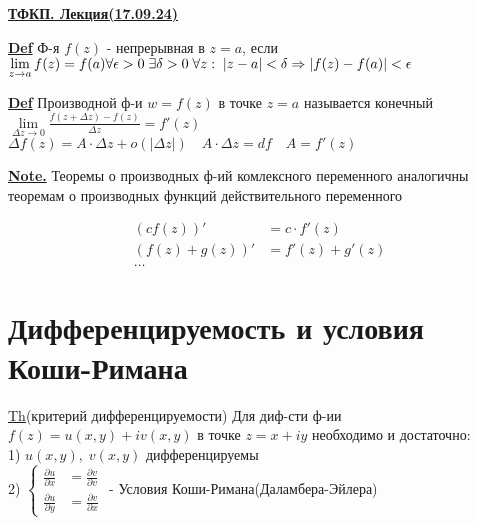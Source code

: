 \documentclass[12pt]{article}
\begin{document}
\begin{center}
    \textbf{\underline{ТФКП. Лекция(17.09.24)}} \\
\end{center}

\textbf{\underline{Def}} Ф-я $ f(z) $ - непрерывная в $z = a$, если 
$ \lim\limits_{z\to a} f(z) = f(a) \\
    \forall \epsilon > 0 \; \exists \delta > 0 \; \forall z: \; |z-a|<\delta 
    \Rightarrow |f(z) - f(a)| < \epsilon 
$

\textbf{\underline{Def}} Производной ф-и $w = f(z) $ в точке $z=a$ называется конечный
$ \lim\limits_{\Delta z \to 0}  \frac{f(z+\Delta z) - f(z)}{\Delta z} = f'(z) $ \\
$ \Delta f(z) = A \cdot \Delta z + o(|\Delta z|) \quad A\cdot \Delta z = df 
\quad A = f'(z)$

\textbf{\underline{Note.}} Теоремы о производных ф-ий комлексного переменного аналогичны
теоремам о производных функций действительного переменного

\begin{equation*}
    \begin{aligned}
        (cf(z))' &= c\cdot f'(z) \\
        (f(z) + g(z))' &= f'(z) + g'(z) \\
        \dots
    \end{aligned}
\end{equation*}

\section*{\centering Дифференцируемость и условия Коши-Римана}

\underline{Th}(критерий дифференцируемости) Для диф-сти ф-ии $ f(z) = u(x,y)
+ iv(x,y)$ в точке $ z  = x+iy $ необходимо и достаточно: \\
1) $ u(x,y), \; v(x,y) $ дифференцируемы \\
2) 
$
\begin{cases}
    \frac{\partial u}{\partial x} &= \frac{\partial v}{\partial v} \\ 
    \frac{\partial u}{\partial y} &= \frac{\partial v}{\partial x}  
    
\end{cases}
$
- Условия Коши-Римана(Даламбера-Эйлера)
\end{document}
